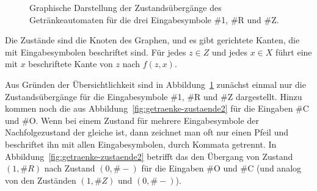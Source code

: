 \begin{figure}[ht]
  \centering
  
  \caption{Graphische Darstellung der Zustandsübergänge des
    Getränkeautomaten für die drei Eingabesymbole \protect\#1, \protect\#R und \protect\#Z.}
  \label{fig:getraenke-zustaende}
\end{figure}

\noindent
Die Zustände sind die Knoten des Graphen, und es gibt gerichtete
Kanten, die mit Eingabesymbolen beschriftet sind. Für jedes $z\in Z$
und jedes $x\in X$ führt eine mit $x$ beschriftete Kante von $z$ nach
$f(z,x)$.

Aus Gründen der Übersichtlichkeit sind in
Abbildung~\ref{fig:getraenke-zustaende} zunächst einmal nur die
Zustandsübergänge für die Eingabesymbole \#1, \#R und \#Z
dargestellt. Hinzu kommen noch die aus
Abbildung~\ref{fig:getraenke-zustaende2} für die Eingaben \#C und
\#O. Wenn bei einem Zustand für mehrere Eingabesymbole der
Nachfolgezustand der gleiche ist, dann zeichnet man oft nur einen
Pfeil und beschriftet ihn mit allen Eingabesymbolen, durch Kommata
getrennt. In Abbildung~\ref{fig:getraenke-zustaende2} betrifft das den
Übergang von Zustand $(1,\#R)$ nach Zustand $(0,\#-)$ für die Eingaben
\#O und \#C (und analog von den Zuständen $(1,\#Z)$ und $(0,\#-)$).

